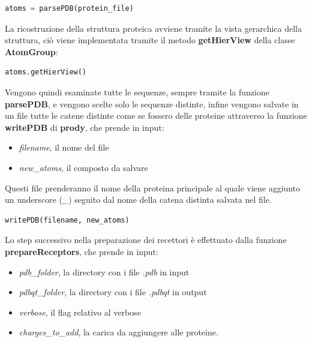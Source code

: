 \begin{lstlisting}[language=Python, label=lst:code23, caption={funzione parsePDB}]
atoms = parsePDB(protein_file)
\end{lstlisting}

La ricostruzione della struttura proteica avviene tramite la vista gerarchica della struttura, ciò viene implementata tramite il metodo \textbf{getHierView} della classe \textbf{AtomGroup}:

\begin{lstlisting}[language=Python, label=lst:code24, caption={atoms.getHierVieW}]
atoms.getHierView()
\end{lstlisting}

Vengono quindi esaminate tutte le sequenze, sempre tramite la funzione \textbf{parsePDB}, e vengono scelte solo le sequenze distinte, infine vengono salvate in un file tutte le catene distinte come se fossero delle proteine attraverso la funzione \textbf{writePDB} di \textbf{prody}, che prende in input:

\begin{itemize}
    \item \textit{filename}, il nome del file
    \item \textit{new\_atoms}, il composto da salvare
\end{itemize}

Questi file prenderanno il nome della proteina principale al quale viene aggiunto un underscore (\textit{\_}) seguito dal nome della catena distinta salvata nel file.

\begin{lstlisting}[language=Python, label=lst:code25, caption={writePDB}]
writePDB(filename, new_atoms)
\end{lstlisting}

Lo step successivo nella preparazione dei recettori è effettuato dalla funzione \textbf{prepareReceptors}, che prende in input:

\begin{itemize}
    \item \textit{pdb\_folder}, la directory con i file \textit{.pdb} in input
    \item \textit{pdbqt\_folder}, la directory con i file \textit{.pdbqt} in output
    \item \textit{verbose}, il flag relativo al verbose
    \item \textit{charges\_to\_add}, la carica da aggiungere alle proteine.
\end{itemize}

